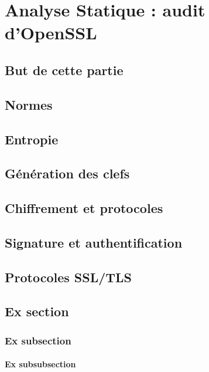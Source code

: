 \chapter{Analyse Statique : audit d'OpenSSL}

\section{But de cette partie}

\section{Normes}

\section{Entropie}

\section{Génération des clefs}

\section{Chiffrement et protocoles}

\section{Signature et authentification}

\section{Protocoles SSL/TLS}







\section{Ex section}
\subsection{Ex subsection}
\subsubsection{Ex subsubsection}


